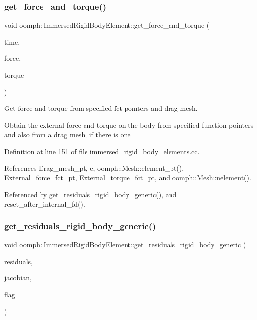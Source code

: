 \subsubsection{\texorpdfstring{get\+\_\+force\+\_\+and\+\_\+torque()}{get\_force\_and\_torque()}}
{\footnotesize\ttfamily void oomph\+::\+Immersed\+Rigid\+Body\+Element\+::get\+\_\+force\+\_\+and\+\_\+torque (\begin{DoxyParamCaption}\item[{const double \&}]{time,  }\item[{\hyperlink{classoomph_1_1Vector}{Vector}$<$ double $>$ \&}]{force,  }\item[{double \&}]{torque }\end{DoxyParamCaption})}



Get force and torque from specified fct pointers and drag mesh. 

Obtain the external force and torque on the body from specified function pointers and also from a drag mesh, if there is one 

Definition at line 151 of file immersed\+\_\+rigid\+\_\+body\+\_\+elements.\+cc.



References Drag\+\_\+mesh\+\_\+pt, e, oomph\+::\+Mesh\+::element\+\_\+pt(), External\+\_\+force\+\_\+fct\+\_\+pt, External\+\_\+torque\+\_\+fct\+\_\+pt, and oomph\+::\+Mesh\+::nelement().



Referenced by get\+\_\+residuals\+\_\+rigid\+\_\+body\+\_\+generic(), and reset\+\_\+after\+\_\+internal\+\_\+fd().

\mbox{\label{classoomph_1_1ImmersedRigidBodyElement_a7890b76d95e13de6436423a2989bf3ec}} 
\subsubsection{\texorpdfstring{get\+\_\+residuals\+\_\+rigid\+\_\+body\+\_\+generic()}{get\_residuals\_rigid\_body\_generic()}}
{\footnotesize\ttfamily void oomph\+::\+Immersed\+Rigid\+Body\+Element\+::get\+\_\+residuals\+\_\+rigid\+\_\+body\+\_\+generic (\begin{DoxyParamCaption}\item[{\hyperlink{classoomph_1_1Vector}{Vector}$<$ double $>$ \&}]{residuals,  }\item[{\hyperlink{classoomph_1_1DenseMatrix}{Dense\+Matrix}$<$ double $>$ \&}]{jacobian,  }\item[{const bool \&}]{flag }\end{DoxyParamCaption})\hspace{0.3cm}{\ttfamily [private]}}



